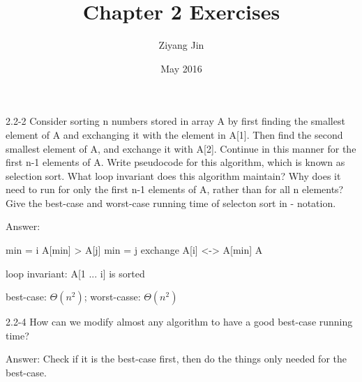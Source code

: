 \documentclass{article}
\title{Chapter 2 Exercises}
\author{Ziyang Jin}
\date{May 2016}
\begin{document}
2.2-2
Consider sorting n numbers stored in array A by first finding the smallest element of A and exchanging it with the element in A[1]. Then find the second  smallest element of A, and exchange it with A[2]. Continue in this manner for the first n-1 elements of A. Write pseudocode for this algorithm, which is known as selection sort. What loop invariant does this algorithm maintain? Why does it need  to run for only the first n-1 elements of A, rather than for all n elements? Give the best-case and worst-case running time of selecton sort in \Theta - notation.

Answer:
\Procedure
\begin{algorithm}
\begin{algorithmic}[1]
        \State min = i
            \If A[min] > A[j]
                \State min = j
            \EndIf
        \EndFor
        \State exchange A[i] <-> A[min]
    \EndFor
    \Return A
\EndProcedure
\end{algorithmic}
\end{algorithm}  
  
loop invariant: A[1 ... i] is sorted
  
best-case: $\Theta(n^2)$; 
worst-casse: $\Theta(n^2)$
\EndProcedure

2.2-4
How can we modify almost any algorithm to have a good best-case running time?

Answer:
  Check if it is the best-case first, then do the things only needed for the best-case.
\end{document}
